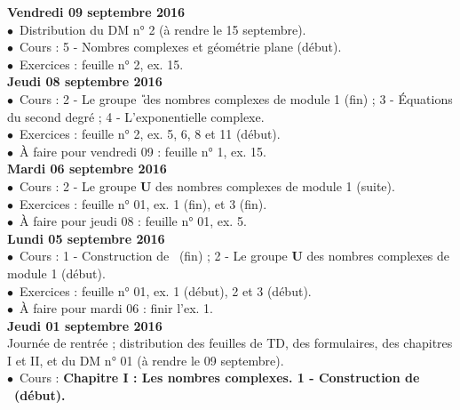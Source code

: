 \documentclass[12pt,a4paper]{article}
\begin{document}
\noindent\textbf{Vendredi 09 septembre 2016 }\\
$\bullet$\ Distribution du DM n° 2 (à rendre le 15 septembre).\\
$\bullet$\ Cours : 5 - Nombres complexes et géométrie plane (début).\\
$\bullet$\ Exercices : feuille n° 2, ex. 15.\vspace{.4cm}\\

\noindent\textbf{\bf Jeudi 08 septembre 2016 }\\
$\bullet$\ Cours : 2 - Le groupe \U\ des nombres complexes de 
module 1 (fin) ; 3 - Équations du second degré ; 4 - L'exponentielle complexe.\\
$\bullet$\ Exercices : feuille n° 2, ex. 5, 6, 8 et 11 (début).\\
$\bullet$\ À faire pour vendredi 09 : feuille n° 1, ex. 15.\vspace{.4cm}\\
  
\noindent\textbf{\bf Mardi 06 septembre 2016 }\\
$\bullet$\ Cours : 2 - Le groupe \textbf{U} des nombres complexes de 
module 1 (suite).\\
$\bullet$\ Exercices : feuille n° 01, ex. 1 (fin), et 3 (fin).\\
$\bullet$\ À faire pour jeudi 08 : feuille n° 01, ex. 5.\vspace{.4cm}\\

\noindent\textbf{\bf Lundi 05 septembre 2016 }\\
$\bullet$\ Cours : 1 - Construction de \C\ (fin) ; 2 - Le groupe \textbf{U} des nombres complexes de 
module 1 (début).\\
$\bullet$\ Exercices : feuille n° 01, ex. 1 (début), 2 et 3 (début).\\
$\bullet$\ À faire pour mardi 06 : finir l'ex. 1.\vspace{.4cm}\\

\noindent\textbf{\bf Jeudi 01 septembre 2016 }\\
Journée de rentrée ; distribution des feuilles de TD, des formulaires, des
chapitres I et II, et du DM n° 01 (à rendre le 09 septembre).\\
$\bullet$\ Cours : \bf Chapitre I \rm : Les nombres complexes. 1 - Construction
de \C\ (début).\vspace{.4cm}\\


\label{end}
\end{document}
